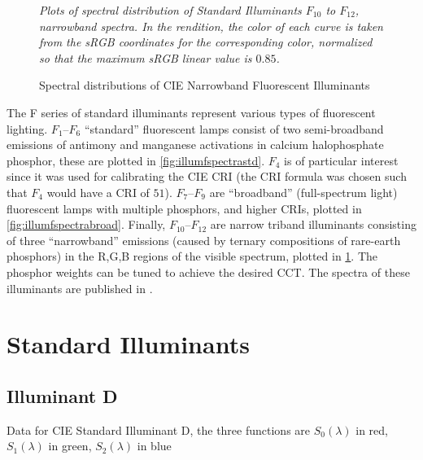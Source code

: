 \begin{figure}
{
\small
\centering
\resizebox{\linewidth}{!}{}
\caption{Spectral distributions of CIE Narrowband Fluorescent Illuminants}
\label{fig:illumfspectranarrow}
}
\vskip 1mm
{\footnotesize\it Plots of spectral distribution of
Standard Illuminants $F_{10}$ to $F_{12}$, narrowband spectra.
In the rendition, the color of each curve is taken from the
sRGB coordinates for the corresponding color,
normalized so that the maximum sRGB linear value is $0.85$.
}
\end{figure}

The F series of standard illuminants represent various types of fluorescent lighting.
$F_1$--$F_6$ ``standard'' fluorescent lamps consist of two semi-broadband
emissions of
antimony and manganese activations in calcium halophosphate phosphor, these are
plotted in \cref{fig:illumfspectrastd}. $F_4$ is of
particular interest since it was used for calibrating the \gls{CIE} \gls{CRI}
(the \gls{CRI} formula was chosen such that $F_4$ would have a \gls{CRI} of
$51$).
$F_7$--$F_9$ are ``broadband'' (full-spectrum light) fluorescent lamps with
multiple phosphors, and higher \glspl{CRI}, plotted in
\cref{fig:illumfspectrabroad}. Finally, $F_{10}$--$F_{12}$ are narrow
triband illuminants consisting of three ``narrowband'' emissions (caused by
ternary
compositions of rare-earth phosphors) in the R,G,B regions of the visible
spectrum, plotted in \cref{fig:illumfspectranarrow}.
The phosphor weights can be tuned to achieve the desired \gls{CCT}.
The spectra of these illuminants are published in \cite{ciecolorimetry}.


\section{Standard Illuminants}\label{ch:stdilldata}

\subsection{Illuminant D}

Data for CIE Standard Illuminant D, the three functions
are $S_0(\lambda)$ in red, $S_1(\lambda)$ in green, $S_2(\lambda)$ in blue

